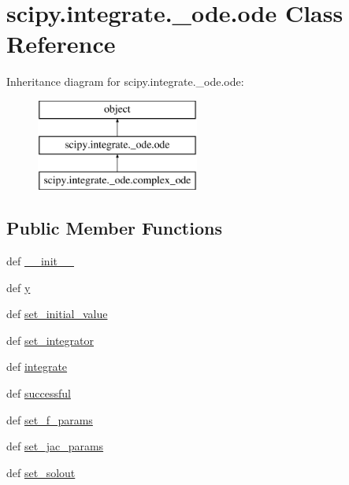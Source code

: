 \hypertarget{classscipy_1_1integrate_1_1__ode_1_1ode}{}\section{scipy.\+integrate.\+\_\+ode.\+ode Class Reference}
\label{classscipy_1_1integrate_1_1__ode_1_1ode}
Inheritance diagram for scipy.\+integrate.\+\_\+ode.\+ode\+:\begin{figure}[H]
\begin{center}
\leavevmode
\includegraphics[height=3.000000cm]{classscipy_1_1integrate_1_1__ode_1_1ode}
\end{center}
\end{figure}
\subsection*{Public Member Functions}
\begin{DoxyCompactItemize}
\item 
def \hyperlink{classscipy_1_1integrate_1_1__ode_1_1ode_a85d68e880625b7404eb2c077dd7b49a7}{\+\_\+\+\_\+init\+\_\+\+\_\+}
\item 
def \hyperlink{classscipy_1_1integrate_1_1__ode_1_1ode_af77bb2cc6ef7d8c8e5c1ff99ceb638e4}{y}
\item 
def \hyperlink{classscipy_1_1integrate_1_1__ode_1_1ode_ae42d9f8d47a2c69b90500bfc0e78c8c0}{set\+\_\+initial\+\_\+value}
\item 
def \hyperlink{classscipy_1_1integrate_1_1__ode_1_1ode_abf6839f8e3685739587cc778f2393ab7}{set\+\_\+integrator}
\item 
def \hyperlink{classscipy_1_1integrate_1_1__ode_1_1ode_a73b5c74520b37f8a10c9c03c70865e91}{integrate}
\item 
def \hyperlink{classscipy_1_1integrate_1_1__ode_1_1ode_a48ddc81b0fc00447f32903cc622a7864}{successful}
\item 
def \hyperlink{classscipy_1_1integrate_1_1__ode_1_1ode_aeafd222b5edba031baf84248155500d3}{set\+\_\+f\+\_\+params}
\item 
def \hyperlink{classscipy_1_1integrate_1_1__ode_1_1ode_a05fa753b4113555b5a14dca8f4e8b891}{set\+\_\+jac\+\_\+params}
\item 
def \hyperlink{classscipy_1_1integrate_1_1__ode_1_1ode_a7d26c39ce5d19507c31cfebefeef0bb1}{set\+\_\+solout}
\end{DoxyCompactItemize}
